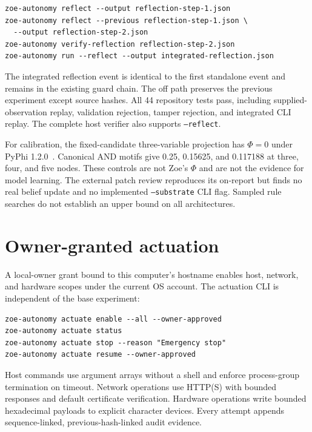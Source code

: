 \documentclass[11pt,a4paper]{article}
\begin{document}
\begin{lstlisting}
zoe-autonomy reflect --output reflection-step-1.json
zoe-autonomy reflect --previous reflection-step-1.json \
  --output reflection-step-2.json
zoe-autonomy verify-reflection reflection-step-2.json
zoe-autonomy run --reflect --output integrated-reflection.json
\end{lstlisting}

The integrated reflection event is identical to the first standalone event and remains in the existing guard chain. The off path preserves the previous experiment except source hashes. All 44 repository tests pass, including supplied-observation replay, validation rejection, tamper rejection, and integrated CLI replay. The complete host verifier also supports \texttt{--reflect}.

For calibration, the fixed-candidate three-variable projection has $\Phi=0$ under PyPhi 1.2.0~\cite{mayner2018pyphi}. Canonical AND motifs give 0.25, 0.15625, and 0.117188 at three, four, and five nodes. These controls are not Zoe's $\Phi$ and are not the evidence for model learning. The external patch review reproduces its on-report but finds no real belief update and no implemented \texttt{--substrate} CLI flag. Sampled rule searches do not establish an upper bound on all architectures.


\section{Owner-granted actuation}
A local-owner grant bound to this computer's hostname enables host, network, and hardware scopes under the current OS account. The actuation CLI is independent of the base experiment:

\begin{lstlisting}
zoe-autonomy actuate enable --all --owner-approved
zoe-autonomy actuate status
zoe-autonomy actuate stop --reason "Emergency stop"
zoe-autonomy actuate resume --owner-approved
\end{lstlisting}

Host commands use argument arrays without a shell and enforce process-group termination on timeout. Network operations use HTTP(S) with bounded responses and default certificate verification. Hardware operations write bounded hexadecimal payloads to explicit character devices. Every attempt appends sequence-linked, previous-hash-linked audit evidence.
\end{document}
